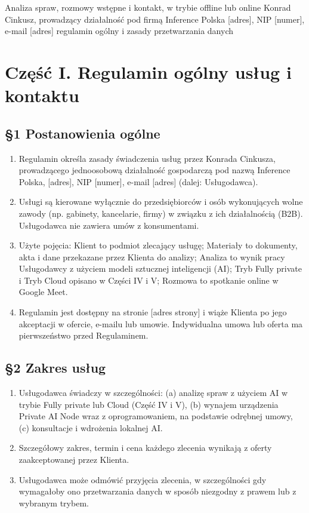 \documentclass[11pt,a4paper]{article}
\begin{document}
  {Analiza spraw, rozmowy wstępne i kontakt, w trybie offline lub online}
  {Konrad Cinkusz, prowadzący działalność pod firmą Inference Polska}
  {[adres], NIP [numer], e-mail [adres]}
  {regulamin ogólny i zasady przetwarzania danych}

\section*{Część I. Regulamin ogólny usług i kontaktu}

\subsection*{§1 Postanowienia ogólne}
\begin{enumerate}
\item Regulamin określa zasady świadczenia usług przez Konrada Cinkusza, prowadzącego jednoosobową działalność gospodarczą pod nazwą Inference Polska, [adres], NIP [numer], e-mail [adres] (dalej: Usługodawca).
\item Usługi są kierowane wyłącznie do przedsiębiorców i osób wykonujących wolne zawody (np. gabinety, kancelarie, firmy) w związku z ich działalnością (B2B). Usługodawca nie zawiera umów z konsumentami.
\item Użyte pojęcia: Klient to podmiot zlecający usługę; Materiały to dokumenty, akta i dane przekazane przez Klienta do analizy; Analiza to wynik pracy Usługodawcy z użyciem modeli sztucznej inteligencji (AI); Tryb Fully private i Tryb Cloud opisano w Części IV i V; Rozmowa to spotkanie online w Google Meet.
\item Regulamin jest dostępny na stronie [adres strony] i wiąże Klienta po jego akceptacji w ofercie, e-mailu lub umowie. Indywidualna umowa lub oferta ma pierwszeństwo przed Regulaminem.
\end{enumerate}

\subsection*{§2 Zakres usług}
\begin{enumerate}
\item Usługodawca świadczy w szczególności: (a) analizę spraw z użyciem AI w trybie Fully private lub Cloud (Część IV i V), (b) wynajem urządzenia Private AI Node wraz z oprogramowaniem, na podstawie odrębnej umowy, (c) konsultacje i wdrożenia lokalnej AI.
\item Szczegółowy zakres, termin i cena każdego zlecenia wynikają z oferty zaakceptowanej przez Klienta.
\item Usługodawca może odmówić przyjęcia zlecenia, w szczególności gdy wymagałoby ono przetwarzania danych w sposób niezgodny z prawem lub z wybranym trybem.
\end{enumerate}
\end{document}

